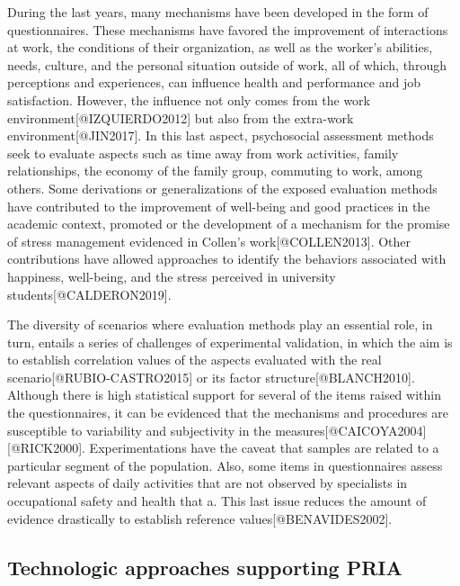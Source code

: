 \documentclass[]{article}
\begin{document}
During the last years, many mechanisms have been developed in the form
of questionnaires. These mechanisms have favored the improvement of
interactions at work, the conditions of their organization, as well as
the worker's abilities, needs, culture, and the personal situation
outside of work, all of which, through perceptions and experiences, can
influence health and performance and job satisfaction. However, the
influence not only comes from the work environment{[}@IZQUIERDO2012{]}
but also from the extra-work environment{[}@JIN2017{]}. In this last
aspect, psychosocial assessment methods seek to evaluate aspects such as
time away from work activities, family relationships, the economy of the
family group, commuting to work, among others. Some derivations or
generalizations of the exposed evaluation methods have contributed to
the improvement of well-being and good practices in the academic
context, promoted or the development of a mechanism for the promise of
stress management evidenced in Collen's work{[}@COLLEN2013{]}. Other
contributions have allowed approaches to identify the behaviors
associated with happiness, well-being, and the stress perceived in
university students{[}@CALDERON2019{]}.

The diversity of scenarios where evaluation methods play an essential
role, in turn, entails a series of challenges of experimental
validation, in which the aim is to establish correlation values of the
aspects evaluated with the real scenario{[}@RUBIO-CASTRO2015{]} or its
factor structure{[}@BLANCH2010{]}. Although there is high statistical
support for several of the items raised within the questionnaires, it
can be evidenced that the mechanisms and procedures are susceptible to
variability and subjectivity in the
measures{[}@CAICOYA2004{]}{[}@RICK2000{]}. Experimentations have the
caveat that samples are related to a particular segment of the
population. Also, some items in questionnaires assess relevant aspects
of daily activities that are not observed by specialists in occupational
safety and health that a. This last issue reduces the amount of evidence
drastically to establish reference values{[}@BENAVIDES2002{]}.

\hypertarget{technologic-approaches-supporting-pria}{%
\subsection{Technologic approaches supporting
PRIA}\label{technologic-approaches-supporting-pria}}
\end{document}
